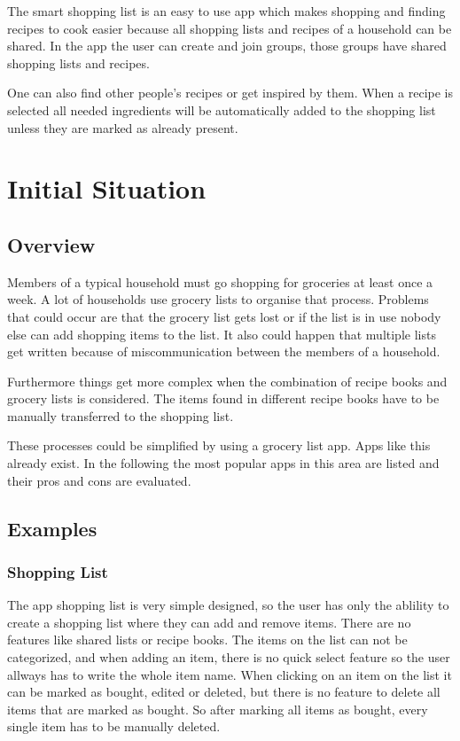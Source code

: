 \documentclass[12pt]{article}
\theoremstyle{definition}
\begin{document}
The smart shopping list is an easy to use app which makes shopping and finding recipes to cook easier because all shopping lists and recipes of a household can be shared. In the app the user can create and join groups, those groups have shared shopping lists and recipes.

One can also find other people's recipes or get inspired by them. When a recipe is selected all needed ingredients will be automatically added to the shopping list unless they are marked as already present. 

\pagebreak

\section{Initial Situation}

\subsection{Overview}

Members of a typical household must go shopping for groceries at least once a week. A lot of households use grocery lists to organise that process. Problems that could occur are that the grocery list gets lost or if the list is in use nobody else can add shopping items to the list. It also could happen that multiple lists get written because of miscommunication between the members of a household.

Furthermore things get more complex when the combination of recipe books and grocery lists is considered. The items found in different recipe books have to be manually transferred to the shopping list. 

These processes could be simplified by using a grocery list app. Apps like this already exist. In the following the most popular apps in this area are listed and their pros and cons are evaluated.

\subsection{Examples}
\subsubsection{Shopping List}
The app shopping list is very simple designed, so the user has only the ablility to create a shopping list where they can add and remove items. There are no features like shared lists or recipe books. The items on the list can not be categorized, and when adding an item, there is no quick select feature so the user allways has to write the whole item name. When clicking on an item on the list it can be marked as bought, edited or deleted, but there is no feature to delete all items that are marked as bought. So after marking all items as bought, every single item has to be manually deleted. 
\end{document}
